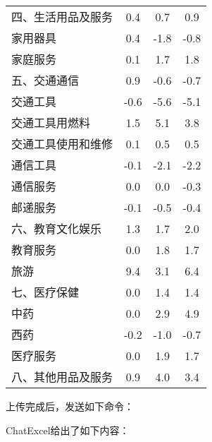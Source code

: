 \begin{table}[h]
\begin{tabular}{lccc}
        \midrule
        四、生活用品及服务 & 0.4 & 0.7 & 0.9 \\
        家用器具 & 0.4 & -1.8 & -0.8 \\
        家庭服务 & 0.1 & 1.7 & 1.8 \\
        \midrule
        五、交通通信 & 0.9 & -0.6 & -0.7 \\
        交通工具 & -0.6 & -5.6 & -5.1 \\
        交通工具用燃料 & 1.5 & 5.1 & 3.8 \\
        交通工具使用和维修 & 0.1 & 0.5 & 0.5 \\
        通信工具 & -0.1 & -2.1 & -2.2 \\
        通信服务 & 0.0 & 0.0 & -0.3 \\
        邮递服务 & -0.1 & -0.5 & -0.4 \\
        \midrule
        六、教育文化娱乐 & 1.3 & 1.7 & 2.0 \\
        教育服务 & 0.0 & 1.8 & 1.7 \\
        旅游 & 9.4 & 3.1 & 6.4 \\
        \midrule
        七、医疗保健 & 0.0 & 1.4 & 1.4 \\
        中药 & 0.0 & 2.9 & 4.9 \\
        西药 & -0.2 & -1.0 & -0.7 \\
        医疗服务 & 0.0 & 1.9 & 1.7 \\
        \midrule
        八、其他用品及服务 & 0.9 & 4.0 & 3.4 \\
        \bottomrule
    \end{tabular}
\end{table}
\FloatBarrier
上传完成后，发送如下命令：


ChatExcel给出了如下内容：




